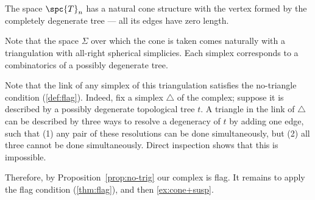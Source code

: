 The space $\spc{T}_n$ has a natural cone structure with the vertex formed by the  completely degenerate tree --- all its edges have zero length.

Note that the space $\Sigma$
over which the cone is taken comes naturally with a triangulation 
with all-right spherical simplicies.
Each simplex corresponds to a combinatorics of a possibly degenerate tree.

Note that the link of any simplex of this triangulation satisfies the no-triangle condition (\ref{def:flag}).
Indeed, fix a simplex $\triangle$ of the complex;
suppose it is described by a possibly degenerate topological tree $t$.
A triangle in the link of  $\triangle$ can be described by three ways to resolve a degeneracy of $t$ by adding one edge,
such that (1) any pair of these resolutions can be done simultaneously, but (2) all three cannot be done simultaneously.
Direct inspection shows that this is impossible.

Therefore, by Proposition~\ref{prop:no-trig} our complex is flag.
It remains to apply the flag condition (\ref{thm:flag}), and then \ref{ex:cone+susp}.
